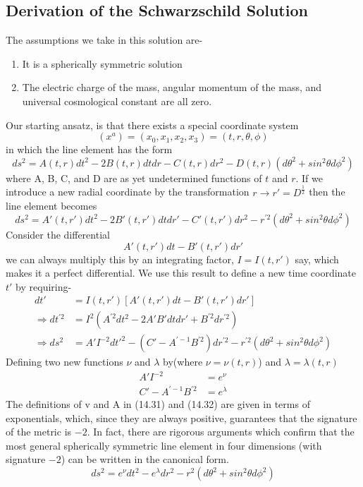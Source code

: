 \documentclass[12pt,a4paper]{article}
\numberwithin{table}{section}
\numberwithin{figure}{section}
\numberwithin{equation}{section}
\theoremstyle{remark}
\theoremstyle{definition}
\begin{document}
\subsection{Derivation of the Schwarzschild Solution}
The assumptions we take in this solution are-
\begin{enumerate}
    \item It is a spherically symmetric solution
    \item The electric charge of the mass, angular momentum of the mass, and universal cosmological constant are all zero. 
\end{enumerate}
Our starting ansatz, is that there exists a special coordinate system
$$(x^a)=(x_0,x_1,x_2,x_3)=(t,r,\theta,\phi)$$
in which the line element has the form 
$$ds^2=A(t,r)dt^2-2B(t,r)dtdr-C(t,r)dr^2-D(t,r)(d\theta^2+sin^2\theta d\phi^2) $$
where A, B, C, and D are as yet undetermined functions of $t$ and $r$.
If we introduce a new radial coordinate by the transformation $r\rightarrow r'=D^\frac{1}{2}$ then the line element becomes
$$ds^2=A'(t,r')dt^2-2B'(t,r')dtdr'-C'(t,r')dr^2-r^{'2}(d\theta^2+sin^2\theta d\phi^2) $$
Consider the differential 
$$A'(t,r')dt-B'(t,r')dr' $$
we can always multiply this by an integrating factor, $I=I(t,r')$ say, which makes it a perfect differential. We use this result to define a new time coordinate $t'$ by requiring-
\begin{align*}
    dt'&=I(t,r')[A'(t,r')dt-B'(t,r')dr']\\
\Rightarrow dt^{'2}&=I^2(A^{'2}dt^2-2A'B'dtdr'+B^{'2}dr^{'2})\\
\Rightarrow ds^2&=A'I^{-2}dt'^2-(C'-A^{'-1}B^{'2})dr^{'2}-r^{'2}(d\theta^2+sin^2\theta d\phi^2)
\end{align*}
Defining two new functions $\nu$ and $\lambda$ by(where $\nu=\nu(t,r)$) and $\lambda=\lambda(t,r)$
\begin{align*}
    A'I^{-2}&=e^{\nu}\\
    C'-A^{'-1}B^{'2}&=e^{\lambda}
\end{align*}
The definitions of v and A in (14.31) and (14.32) are given in terms of 
exponentials, which, since they are always positive, guarantees that the 
signature of the metric is $-2$. In fact, there are rigorous arguments which 
confirm that the most general spherically symmetric line element in four 
dimensions (with signature $-2$) can be written in the canonical form.
\begin{equation}
    ds^2=e^{\nu}dt^2-e^{\lambda}dr^{2}-r^{2}(d\theta^2+sin^2\theta d\phi^2)
\end{equation}
\end{document}
